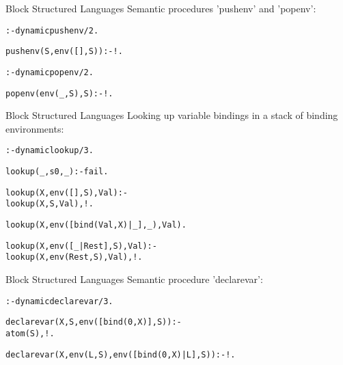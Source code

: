 \documentclass{beamer}
\begin{document}
\begin{frame}[fragile]{Block Structured Languages}
Semantic procedures 'pushenv' and 'popenv':
\begin{alltt}
\scriptsize
%%%%%%%%%%%%%%%%%%%%%%%%%%%%%%%%%%%%%%%%%%%%%%%%%%%%%%%%%%%%%%%%%%%%%
% the predicate 'pushenv(+State,-FinalState)' pushes
% a new binding term list on the stack
:- dynamic pushenv/2.

pushenv(S,env([],S)) :- !.

%%%%%%%%%%%%%%%%%%%%%%%%%%%%%%%%%%%%%%%%%%%%%%%%%%%%%%%%%%%%%%%%%%%%%
% the predicate 'popenv(+State,-FinalState)' pops
% a  binding term list off the stack
:- dynamic popenv/2.

popenv(env(_,S),S) :- !.
\end{alltt}
\end{frame}

\begin{frame}[fragile]{Block Structured Languages}
Looking up variable bindings in a stack of binding environments:
\begin{alltt}\scriptsize
% the predicate 'lookup(+Variable,+State,-Value)' looks up
% the variable in the state and returns its bound value.
:- dynamic lookup/3.                % modifiable predicate

lookup(_,s0,_) :- fail.

lookup(X,env([],S),Val) :-
    lookup(X,S,Val),!.

lookup(X,env([bind(Val,X)|_],_),Val).

lookup(X,env([_|Rest],S),Val) :- 
    lookup(X,env(Rest,S),Val),!.
\end{alltt}
\end{frame}


\begin{frame}[fragile]{Block Structured Languages}
Semantic procedure 'declarevar':
\begin{alltt}\scriptsize
% the predicate 'declarevar(+Variable,+State,-FinalState)' declares
% a variable by inserting a new binding term into the current
% environment.
:- dynamic declarevar/3.                   % modifiable predicate

declarevar(X,S,env([bind(0,X)],S)) :-
    atom(S),!.

declarevar(X,env(L,S),env([bind(0,X)|L],S)) :- !.
\end{alltt}
\end{frame}
\end{document}
